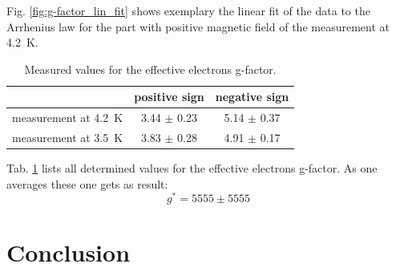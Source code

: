 \documentclass[12pt,a4paper]{article}
\begin{document}
Fig. \ref{fig:g-factor_lin_fit} shows exemplary the linear fit of the data to the Arrhenius law for the part with positive magnetic field of the measurement at \SI{4.2}{K}.

\begin{table} [H]
\centering
\begin{tabular}{|c|c|c|}
\hline 
 & positive sign & negative sign \\ 
\hline 
measurement at \SI{4.2}{K} & 3.44 $\pm$ 0.23 & 5.14 $\pm$ 0.37 \\ 
\hline 
measurement at \SI{3.5}{K} & 3.83 $\pm$ 0.28 & 4.91 $\pm$ 0.17 \\ 
\hline 
\end{tabular} 
\caption{Measured values for the effective electrons g-factor.}
\label{tab:electron_g_factor}
\end{table}

Tab. \ref{tab:electron_g_factor} lists all determined values for the effective electrons g-factor. As one averages these one gets as result:
\begin{equation*}
g^* = 5555 \pm 5555
\end{equation*}



\section{Conclusion}
\end{document}
